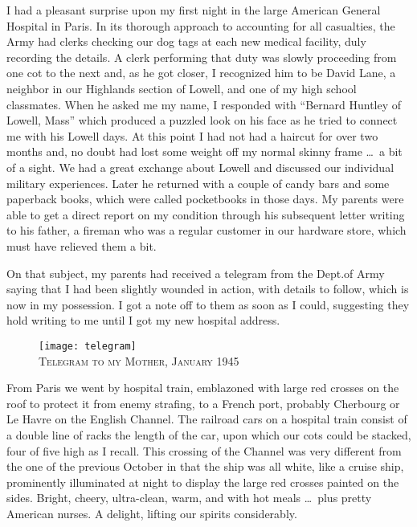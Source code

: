 \documentclass[../m3y]{subfiles}
\begin{document}
I had a pleasant surprise upon my first night in the large American General Hospital in Paris. In its thorough approach to accounting for all casualties, the Army had clerks checking our dog tags at each new medical facility, duly recording the details. A clerk performing that duty was slowly proceeding from one cot to the next and, as he got closer, I recognized him to be David Lane, a neighbor in our Highlands section of Lowell, and one of my high school classmates. When he asked me my name, I responded with ``Bernard Huntley of Lowell, Mass'' which produced a puzzled look on his face as he tried to connect me with his Lowell days. At this point I had not had a haircut for over two months and, no doubt had lost some weight off my normal skinny frame \ldots\ a bit of a sight. We had a great exchange about Lowell and discussed our individual military experiences. Later he returned with a couple of candy bars and some paperback books, which were called pocketbooks in those days. My parents were able to get a direct report on my condition through his subsequent letter writing to his father, a fireman who was a regular customer in our hardware store, which must have relieved them a bit.

On that subject, my parents had received a telegram from the Dept.\@ of Army saying that I had been slightly wounded in action, with details to follow, which is now in my possession. I got a note off to them as soon as I could, suggesting they hold writing to me until I got my new hospital address.

\begin{figure}
\centering
\texttt{[image: telegram]}\\
\medskip
{\newtimes\textsc{Telegram to my Mother, January 1945}}
\end{figure}

From Paris we went by hospital train, emblazoned with large red crosses on the roof to protect it from enemy strafing, to a French port, probably Cherbourg or Le Havre on the English Channel. The railroad cars on a hospital train consist of a double line of racks the length of the car, upon which our cots could be stacked, four of five high as I recall. This crossing of the Channel was very different from the one of the previous October in that the ship was all white, like a cruise ship, prominently illuminated at night to display the large red crosses painted on the sides. Bright, cheery, ultra-clean, warm, and with hot meals \ldots\ plus pretty American nurses. A delight, lifting our spirits considerably.
\end{document}
